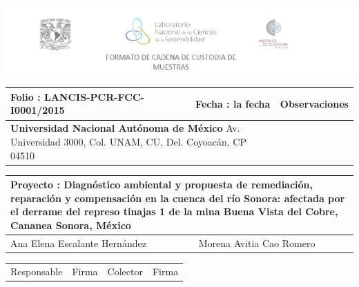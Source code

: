 \documentclass{article}
\begin{document}
\begin{center}
	
	\includegraphics{encabezado.png}

	 \begin{tabular}{ | p{7cm} | p{3.5cm} | p{7cm} |}
	\hline
	Folio : {\color{red}LANCIS-PCR-FCC-I0001/2015} & Fecha : la fecha & Observaciones \\ 	\hline
	
	\multicolumn{2}{|p{10.5cm}|}{\textbf{Universidad Nacional Autónoma de México }\newline 
    Av. Universidad 3000, Col. UNAM, CU, Del. Coyoacán, CP 04510}

	
	
	 &  \\ 	\hline
	
	
	\end{tabular}
	
	\begin{tabular}{ | p{9.1cm} | p{9.1cm} |}
	\hline
	\multicolumn{2}{|p{18.2cm}|}{Proyecto : Diagnóstico ambiental y propuesta de remediación, reparación y compensación en la cuenca del río Sonora: afectada por el derrame del represo tinajas 1 de la mina Buena Vista del Cobre, Cananea Sonora, México }\\[3ex] 
	\hline
	Ana Elena Escalante Hernández & Morena Avitia Cao Romero\\ 	\hline
	\end{tabular} 
	{\color{Gray}
	\begin{tabular}{ p{7cm} p{1cm} p{7cm} p{1cm} }
	Responsable & Firma & Colector & Firma 
	\end{tabular}
	}
	
	\vspace{0.5cm}
	

\end{center}
\end{document}
